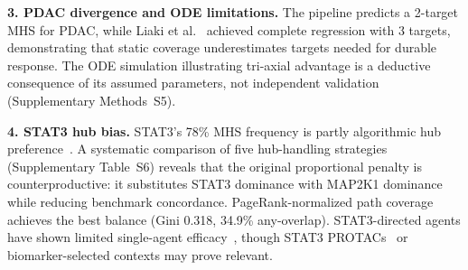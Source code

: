 \documentclass[11pt]{article}
\begin{document}
\textbf{3. PDAC divergence and ODE limitations.} The pipeline predicts a 2-target MHS for PDAC, while Liaki et al.~\cite{Liaki2025} achieved complete regression with 3 targets, demonstrating that static coverage underestimates targets needed for durable response. The ODE simulation illustrating tri-axial advantage is a deductive consequence of its assumed parameters, not independent validation (Supplementary Methods~S5).

\textbf{4. STAT3 hub bias.} STAT3's 78\% MHS frequency is partly algorithmic hub preference~\cite{VeraLicona2013}. A systematic comparison of five hub-handling strategies (Supplementary Table~S6) reveals that the original proportional penalty is counterproductive: it substitutes STAT3 dominance with MAP2K1 dominance while reducing benchmark concordance. PageRank-normalized path coverage achieves the best balance (Gini 0.318, 34.9\% any-overlap). STAT3-directed agents have shown limited single-agent efficacy~\cite{Johnson2018,Jonker2018}, though STAT3 PROTACs~\cite{Bai2019} or biomarker-selected contexts may prove relevant.
\end{document}
